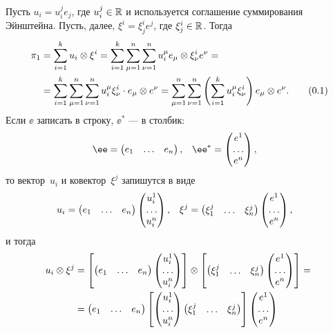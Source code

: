 \begin{solution}
	Пусть $u_i = u_i^j e_j$, где $u_i^j \in \mathbb{R}$ и используется соглашение суммирования Эйнштейна. Пусть, далее, $\xi^i = \xi^i_j e^j$, где $\xi^i_j \in \mathbb{R}$. Тогда
	\begin{align*}
		\pi_1 &=
		\sum_{i = 1}^k
			u_i \otimes \xi^i
		=
		\sum_{i = 1}^k
		\sum_{\mu = 1}^n
		\sum_{\nu = 1}^n
			u_i^\mu e_\mu \otimes \xi^i_\nu e^\nu
		\nlinea{=}
		\sum_{i = 1}^k
		\sum_{\mu = 1}^n
		\sum_{\nu = 1}^n
			u_i^\mu \xi^i_\nu \cdot e_\mu \otimes e^\nu
		=
		\sum_{\mu = 1}^n
		\sum_{\nu = 1}^n
		\left( 
			\sum_{i = 1}^k
				u_i^\mu \xi^i_\nu 
		\right)
		e_\mu \otimes e^\nu
		.
		\refstepcounter{equation}
		\tag{\theequation}
		\label{eq:num_06:crd:pi_1}
	\end{align*}
	Если $\ee$ записать в строку, $\ee^*$ --- в столбик:
	\begin{align*}
		\ee &=
		\Vect{
			e_1 & \dots & e_n
		}
		,
		&
		\ee^* &=
		\Vect{
			e^1 \\ \dots \\ e^n
		}
		,
	\end{align*}
	то вектор~$u_i$ и ковектор~$\xi^j$ запишутся в виде
	\begin{align*}
		u_i
		&=
		\begin{pmatrix}
			e_1 & \dots & e_n
		\end{pmatrix}
		\begin{pmatrix}u_i^1 \\ \dots \\ u_i^n\end{pmatrix},
		&
		\xi^j
		&=
		\begin{pmatrix}\xi^j_1 & \dots & \xi^j_n\end{pmatrix}
		\begin{pmatrix}
			e^1 \\ \dots \\ e^n
		\end{pmatrix}
		,
	\end{align*}
	и тогда
	\begin{align*}
		u_i \otimes \xi^j
		&=
		\left[ 
			\Vect{
				e_1 & \dots & e_n
			}
			\Vect{u_i^1 \\ \dots \\ u_i^n}
		\right]
		\otimes
		\left[ 
			\Vect{\xi^j_1 & \dots & \xi^j_n}
			\Vect{
				e^1 \\ \dots \\ e^n
			}
		\right]
		\nlinea{=}
		\Vect{
			e_1 & \dots & e_n
		}
		\left[ 
			\Vect{u_i^1 \\ \dots \\ u_i^n}
			\Vect{\xi^j_1 & \dots & \xi^j_n}
		\right]
		\Vect{
			e^1 \\ \dots \\ e^n
		}

\end{align*}
\end{solution}
